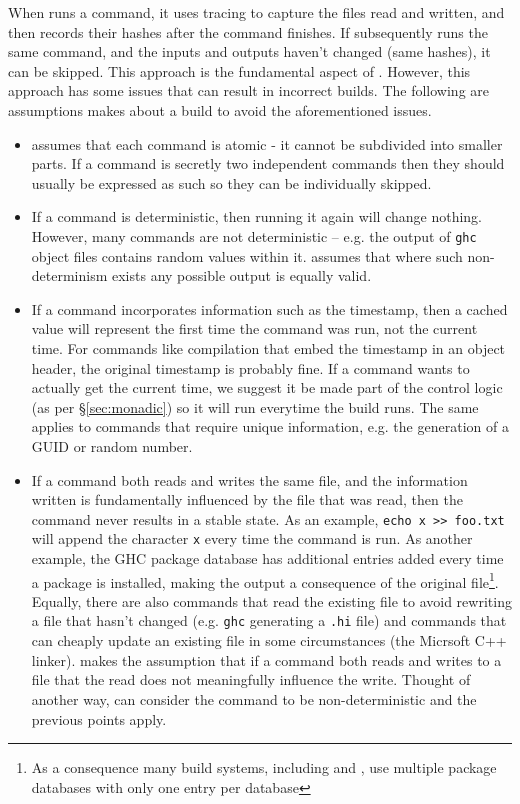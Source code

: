 When \Rattle runs a command, it uses tracing to capture the files read and written, and then records their hashes after the command finishes. If \Rattle subsequently runs the same command, and the inputs and outputs haven't changed (same hashes), it can be skipped. This approach is the fundamental aspect of \Fabricate\citep{fabricate}. However, this approach has some issues that can result in incorrect builds.  The following are assumptions \Rattle makes about a build to avoid the aforementioned issues.


\begin{itemize}
\item \Rattle assumes that each command is atomic - it cannot be subdivided into smaller parts. If a command is secretly two independent commands then they should usually be expressed as such so they can be individually skipped.
  
\item If a command is deterministic, then running it again will change nothing. However, many commands are not deterministic -- e.g. the output of \texttt{ghc} object files contains random values within it. \Rattle assumes that where such non-determinism exists any possible output is equally valid.
  
\item If a command incorporates information such as the timestamp, then a cached value will represent the first time the command was run, not the current time. For commands like compilation that embed the timestamp in an object header, the original timestamp is probably fine.  If a command wants to actually get the current time, we suggest it be made part of the control logic (as per \S\ref{sec:monadic}) so it will run everytime the build runs. The same applies to commands that require unique information, e.g. the generation of a GUID or random number.
  
\item If a command both reads and writes the same file, and the information written is fundamentally influenced by the file that was read, then the command never results in a stable state. As an example, \verb"echo x >> foo.txt" will append the character \texttt{x} every time the command is run. As another example, the GHC package database has additional entries added every time a package is installed, making the output a consequence of the original file\footnote{As a consequence many build systems, including \Bazel and \Rattle, use multiple package databases with only one entry per database}. Equally, there are also commands that read the existing file to avoid rewriting a file that hasn't changed (e.g. \texttt{ghc} generating a \texttt{.hi} file) and commands that can cheaply update an existing file in some circumstances (the Micrsoft C++ linker). \Rattle makes the assumption that if a command both reads and writes to a file that the read does not meaningfully influence the write. Thought of another way, \Rattle can consider the command to be non-deterministic and the previous points apply.  
  

\end{itemize}
